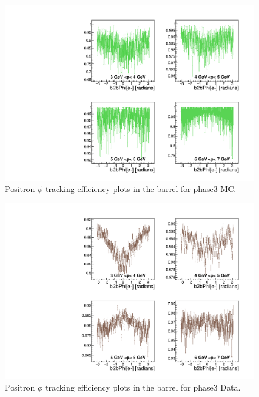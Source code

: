 \documentclass[a4paper,11pt,twosided,final,german,openbib,pdftex,listof=totoc,bibliography=totoc]{scrbook}
\begin{document}
\begin{appendix}
\begin{figure}[!htbp]
	\centering
	\includegraphics[width=\textwidth]{Plots/master3/xPMPhiepBarrel_MCP3}
	\caption[Momentum $\phi$ Positron Barrel Efficiency Phase3 MC]{Positron $\phi$ tracking efficiency plots in the barrel for phase3 MC.}
	\label{plt:PMPhiepBarrel3_MC}
\end{figure}


\begin{figure}[!htbp]
	\centering
	\includegraphics[width=\textwidth]{Plots/master3/xPMPhiepBarrel_DataP3}
	\caption[Momentum $\phi$ Positron Barrel Efficiency Phase3 Data]{Positron $\phi$ tracking efficiency plots in the barrel for phase3 Data.}
	\label{plt:PMPhiepBarrel3_Data}
\end{figure}




\end{appendix}
\end{document}
